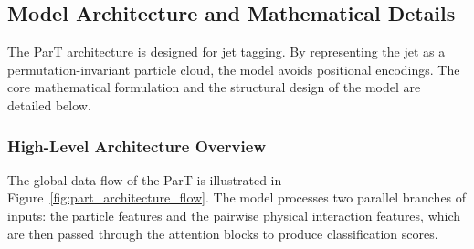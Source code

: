 \documentclass[12pt]{article}
\begin{document}
    \subsection{Model Architecture and Mathematical Details}%
    \label{sub:model_architecture_and_mathematical_details}

        The ParT architecture is designed for jet tagging. By representing the jet as a permutation-invariant particle cloud, the model avoids positional encodings. The core mathematical formulation and the structural design of the model are detailed below.

        \subsubsection{High-Level Architecture Overview}

            The global data flow of the ParT is illustrated in Figure~\ref{fig:part_architecture_flow}. The model processes two parallel branches of inputs: the particle features and the pairwise physical interaction features, which are then passed through the attention blocks to produce classification scores.
\end{document}
